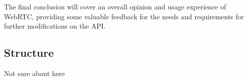 The final conclusion will cover an overall opinion and usage experience of WebRTC, providing some valuable feedback for the needs and requirements for further modifications on the API.

\subsection{Structure}

Not sure about here
